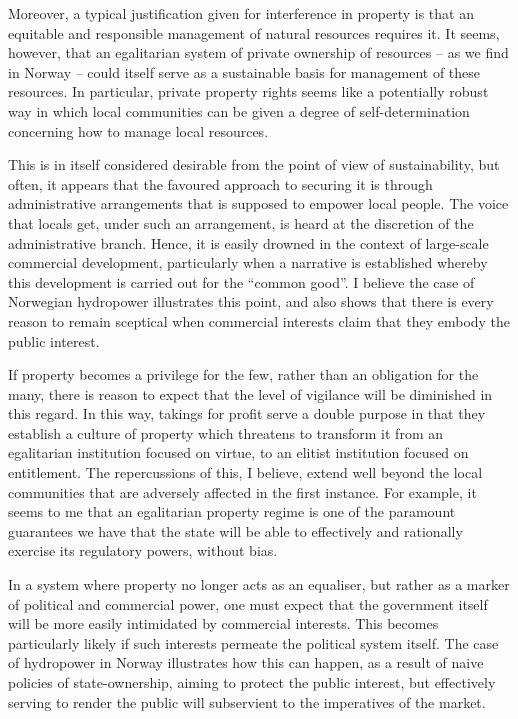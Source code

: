 {{Moreover, a typical justification given for interference in property is that an equitable and responsible management of natural resources requires it. It seems, however, that an egalitarian system of private ownership of resources -- as we find in Norway -- could itself serve as a sustainable basis for management of these resources. In particular, private property rights seems like a potentially robust way in which local communities can be given a degree of self-determination concerning how to manage local resources. 

This is in itself considered desirable from the point of view of sustainability, but often, it appears that the favoured approach to securing it is through administrative arrangements that is supposed to empower local people. The voice that locals get, under such an arrangement, is heard at the discretion of the administrative branch. Hence, it is easily drowned in the context of large-scale commercial development, particularly when a narrative is established whereby this development is carried out for the ``common good''. I believe the case of Norwegian hydropower illustrates this point, and also shows that there is every reason to remain sceptical when commercial interests claim that they embody the public interest.

If property becomes a privilege for the few, rather than an obligation for the many, there is reason to expect that the level of vigilance will be diminished in this regard. In this way, takings for profit serve a double purpose in that they establish a culture of property which threatens to transform it from an egalitarian institution focused on virtue, to an elitist institution focused on entitlement.
The repercussions of this, I believe, extend well beyond the local communities that are adversely affected in the first instance. For example, it seems to me that an egalitarian property regime is one of the paramount guarantees we have that the state will be able to effectively and rationally exercise its regulatory powers, without bias. 

In a system where property no longer acts as an equaliser, but rather as a marker of political and commercial power, one must expect that the government itself will be more easily intimidated by commercial interests. This becomes particularly likely if such interests permeate the political system itself. The case of hydropower in Norway illustrates how this can happen, as a result of naive policies of state-ownership, aiming to protect the public interest, but effectively serving to render the public will subservient to the imperatives of the market. 

}}
